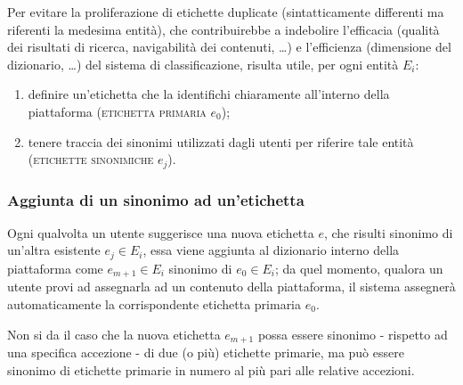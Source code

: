 \documentclass[10pt,a4paper,headinclude,footinclude,hidelinks]{scrreprt} %
\begin{document}

	Per evitare la proliferazione di etichette duplicate (sintatticamente differenti ma riferenti la medesima entità), che contribuirebbe a indebolire l'efficacia (qualità dei risultati di ricerca, navigabilità dei contenuti, \ldots) e l'efficienza (dimensione del dizionario, \ldots) del sistema di classificazione, risulta utile, per ogni entità $E_i$:
	\begin{enumerate}
	\item definire un'etichetta che la identifichi chiaramente all'interno della piattaforma (\textsc{etichetta primaria} $e_0$);
	\item tenere traccia dei sinonimi utilizzati dagli utenti per riferire tale entità (\textsc{etichette sinonimiche} $e_j$).
	\end{enumerate}


	\subsubsection{Aggiunta di un sinonimo ad un'etichetta}
	Ogni qualvolta un utente suggerisce una nuova etichetta $e$, che risulti sinonimo di un'altra esistente $e_j \in E_i$, essa viene aggiunta al dizionario interno della piattaforma come $e_{m+1} \in E_i$ sinonimo di $e_0 \in E_i$; da quel momento, qualora un utente provi ad assegnarla ad un contenuto della piattaforma, il sistema assegnerà automaticamente la corrispondente etichetta primaria $e_0$.

	Non si da il caso che la nuova etichetta $e_{m+1}$ possa essere sinonimo - rispetto ad una specifica accezione - di due (o più) etichette primarie, ma può essere sinonimo di etichette primarie in numero al più pari alle relative accezioni.
\end{document}
